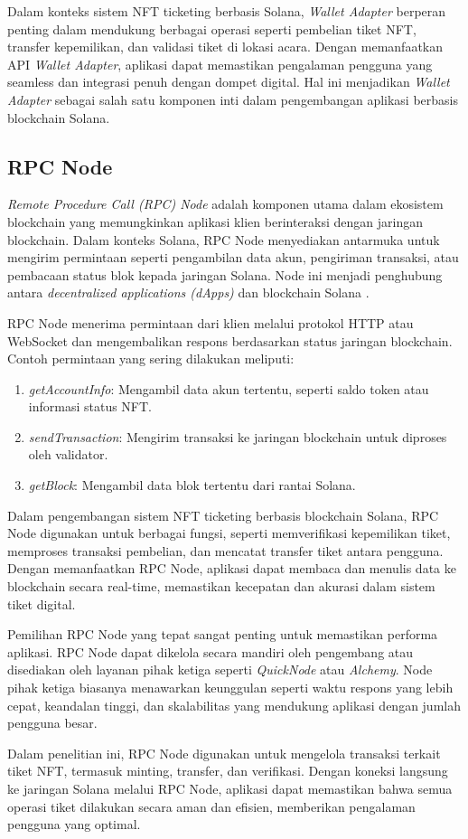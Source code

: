 Dalam konteks sistem NFT ticketing berbasis Solana, \textit{Wallet Adapter} berperan penting dalam mendukung berbagai operasi seperti pembelian tiket NFT, transfer kepemilikan, dan validasi tiket di lokasi acara. Dengan memanfaatkan API \textit{Wallet Adapter}, aplikasi dapat memastikan pengalaman pengguna yang seamless dan integrasi penuh dengan dompet digital. Hal ini menjadikan \textit{Wallet Adapter} sebagai salah satu komponen inti dalam pengembangan aplikasi berbasis blockchain Solana.
\subsection{RPC Node}

\textit{Remote Procedure Call (RPC) Node} adalah komponen utama dalam ekosistem blockchain yang memungkinkan aplikasi klien berinteraksi dengan jaringan blockchain. Dalam konteks Solana, RPC Node menyediakan antarmuka untuk mengirim permintaan seperti pengambilan data akun, pengiriman transaksi, atau pembacaan status blok kepada jaringan Solana. Node ini menjadi penghubung antara \textit{decentralized applications (dApps)} dan blockchain Solana \parencite{ref9}.

RPC Node menerima permintaan dari klien melalui protokol HTTP atau WebSocket dan mengembalikan respons berdasarkan status jaringan blockchain. Contoh permintaan yang sering dilakukan meliputi:
\begin{enumerate}
    \item \textit{getAccountInfo}: Mengambil data akun tertentu, seperti saldo token atau informasi status NFT.
    \item \textit{sendTransaction}: Mengirim transaksi ke jaringan blockchain untuk diproses oleh validator.
    \item \textit{getBlock}: Mengambil data blok tertentu dari rantai Solana.
\end{enumerate}

Dalam pengembangan sistem NFT ticketing berbasis blockchain Solana, RPC Node digunakan untuk berbagai fungsi, seperti memverifikasi kepemilikan tiket, memproses transaksi pembelian, dan mencatat transfer tiket antara pengguna. Dengan memanfaatkan RPC Node, aplikasi dapat membaca dan menulis data ke blockchain secara real-time, memastikan kecepatan dan akurasi dalam sistem tiket digital.

Pemilihan RPC Node yang tepat sangat penting untuk memastikan performa aplikasi. RPC Node dapat dikelola secara mandiri oleh pengembang atau disediakan oleh layanan pihak ketiga seperti \textit{QuickNode} atau \textit{Alchemy}. Node pihak ketiga biasanya menawarkan keunggulan seperti waktu respons yang lebih cepat, keandalan tinggi, dan skalabilitas yang mendukung aplikasi dengan jumlah pengguna besar.

Dalam penelitian ini, RPC Node digunakan untuk mengelola transaksi terkait tiket NFT, termasuk minting, transfer, dan verifikasi. Dengan koneksi langsung ke jaringan Solana melalui RPC Node, aplikasi dapat memastikan bahwa semua operasi tiket dilakukan secara aman dan efisien, memberikan pengalaman pengguna yang optimal.
